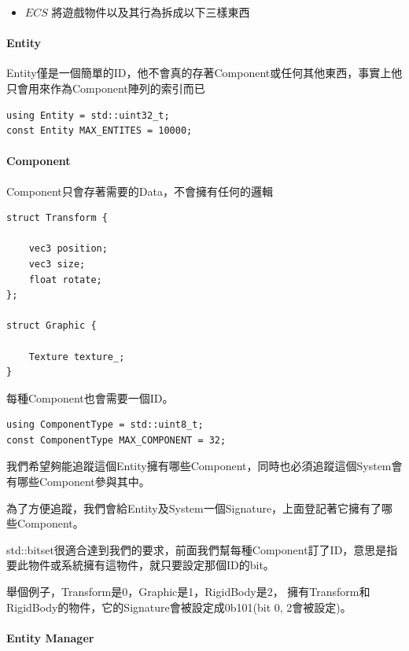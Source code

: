 \begin{itemize}
    \item{$ECS$ 將遊戲物件以及其行為拆成以下三樣東西}
\end{itemize}

\paragraph{Entity}

Entity僅是一個簡單的ID，他不會真的存著Component或任何其他東西，事實上他只會用來作為Component陣列的索引而已

\begin{lstlisting}
using Entity = std::uint32_t;
const Entity MAX_ENTITES = 10000;
\end{lstlisting}

\paragraph{Component}

Component只會存著需要的Data，不會擁有任何的邏輯

\begin{lstlisting}
struct Transform {

    vec3 position;
    vec3 size;
    float rotate;
};

struct Graphic {

    Texture texture_;
}
\end{lstlisting}

每種Component也會需要一個ID。

\begin{lstlisting}
using ComponentType = std::uint8_t;
const ComponentType MAX_COMPONENT = 32;
\end{lstlisting}

我們希望夠能追蹤這個Entity擁有哪些Component，同時也必須追蹤這個System會有哪些Component參與其中。

為了方便追蹤，我們會給Entity及System一個Signature，上面登記著它擁有了哪些Component。

std::bitset很適合達到我們的要求，前面我們幫每種Component訂了ID，意思是指要此物件或系統擁有這物件，就只要設定那個ID的bit。

舉個例子，Transform是0，Graphic是1，RigidBody是2，
擁有Transform和RigidBody的物件，它的Signature會被設定成0b101(bit 0, 2會被設定)。

\paragraph{Entity Manager}


